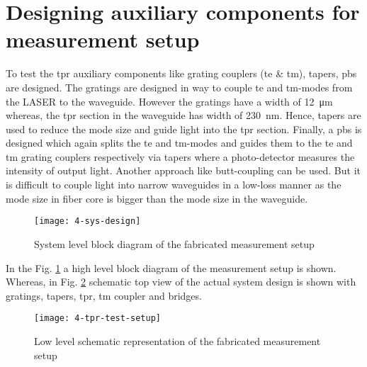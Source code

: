 \documentclass[../report.tex]{subfiles}
\begin{document}
\section{Designing auxiliary components for measurement setup}
To test the \gls{tpr} auxiliary components like grating couplers (\gls{te} \& \gls{tm}), tapers, \gls{pbs} are designed. The gratings are designed in way to couple \gls{te} and \gls{tm}-modes from the LASER to the waveguide. However the gratings have a width of \SI{12}{\micro \meter} whereas, the \gls{tpr} section in the waveguide has width of \SI{230}{\nano \meter}. Hence, tapers are used to reduce the mode size and guide light into the \gls{tpr} section. Finally, a \gls{pbs} is designed which again splits the \gls{te} and \gls{tm}-modes and guides them to the \gls{te} and \gls{tm} grating couplers respectively via tapers where a photo-detector measures the intensity of output light. Another approach like butt-coupling can be used. But it is difficult to couple light into narrow waveguides in a low-loss manner as the mode size in fiber core is bigger than the mode size in the waveguide.  

\begin{figure}[H] %
	\centering
	\texttt{[image: 4-sys-design]}
	\caption{System level block diagram of the fabricated measurement setup}
	\label{fig:4_sys_design}
\end{figure}
\noindent In the Fig. \ref{fig:4_sys_design} a high level block diagram of the measurement setup is shown. Whereas, in Fig. \ref{fig:4_tpr_test_setup} schematic top view of the actual system design is shown with gratings, tapers, \gls{tpr}, \gls{tm} coupler and bridges. 
\begin{figure}[H] %
	\centering
	\texttt{[image: 4-tpr-test-setup]}
	\caption{Low level schematic representation of the fabricated measurement setup}
	\label{fig:4_tpr_test_setup}
\end{figure}
\end{document}

